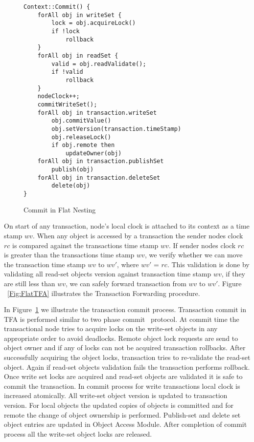 \documentclass[12pt,english]{report}
\begin{document}
\begin{figure}[H]
\begin{minipage}[b]{0.9\linewidth}\centering
\begin{lstlisting}
Context::Commit() {
	forAll obj in writeSet {
		lock = obj.acquireLock()
		if !lock
			rollback
	}
	forAll obj in readSet {
		valid = obj.readValidate();
		if !valid
			rollback
	}
	nodeClock++;
	commitWriteSet();
	forAll obj in transaction.writeSet
		obj.commitValue()
 		obj.setVersion(transaction.timeStamp)
 		obj.releaseLock()
 		if obj.remote then
 			updateOwner(obj)
	forAll obj in transaction.publishSet
		publish(obj)
	forAll obj in transaction.deleteSet
		delete(obj)
}
\end{lstlisting}
\end{minipage}
\caption{Commit in Flat Nesting}
\label{Fig:FlatCommit}
\end{figure}

On start of any transaction, node's local clock is attached to its context as a time stamp $wv$. When any object is accessed by a transaction the sender nodes clock $rc$ is compared against the transactions time stamp $wv$. If sender nodes clock $rc$ is greater than the transactions time stamp $wv$, we verify whether we can move the transaction time stamp $wv$ to $wv'$, where $wv'$ = $rc$. This validation is done by validating all read-set objects version against transaction time stamp $wv$, if they are still less than $wv$, we can safely forward transaction from $wv$ to $wv'$. Figure ~\ref{Fig:FlatTFA} illustrates the Transaction Forwarding procedure.

In Figure~\ref{Fig:FlatCommit} we illustrate the transaction commit process. Transaction commit in TFA is performed similar to two phase commit~\cite{TwoPC:weikum1991principles} protocol. At commit time the transactional node tries to acquire locks on the write-set objects in any appropriate order to avoid deadlocks. Remote object lock requests are send to object owner and if any of locks can not be acquired transaction rollbacks. After successfully acquiring the object locks, transaction tries to re-validate the read-set object. Again if read-set objects validation fails the transaction performs rollback. Once write set locks are acquired and read-set objects are validated it is safe to commit the transaction. In commit process for write transactions local clock is increased atomically. All write-set object version is updated to transaction version. For local objects the updated copies of objects is committed and for remote the change of object ownership is performed. Publish-set and delete set object entries are updated in Object Access Module. After completion of commit process all the write-set object locks are released. 
   
\end{document}
